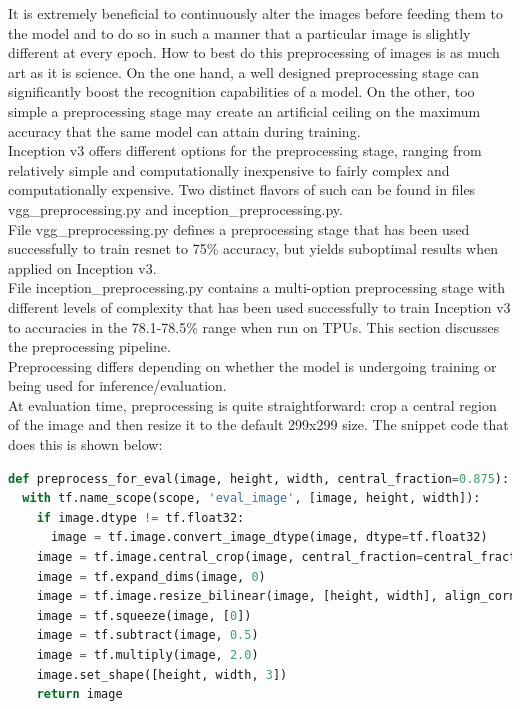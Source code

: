 \documentclass[14pt]{report}
\begin{document}
				It is extremely beneficial to continuously alter the images before feeding them to the model and to do so in such a manner that a particular image is slightly different at every epoch. How to best do this preprocessing of images is as much art as it is science. On the one hand, a well designed preprocessing stage can significantly boost the recognition capabilities of a model. On the other, too simple a preprocessing stage may create an artificial ceiling on the maximum accuracy that the same model can attain during training.\\

				Inception v3 offers different options for the preprocessing stage, ranging from relatively simple and computationally inexpensive to fairly complex and computationally expensive. Two distinct flavors of such can be found in files vgg\_preprocessing.py and inception\_preprocessing.py.\\

				File vgg\_preprocessing.py defines a preprocessing stage that has been used successfully to train resnet to 75\% accuracy, but yields suboptimal results when applied on Inception v3.\\

				File inception\_preprocessing.py contains a multi-option preprocessing stage with different levels of complexity that has been used successfully to train Inception v3 to accuracies in the 78.1-78.5\% range when run on TPUs. This section discusses the preprocessing pipeline.\\

				Preprocessing differs depending on whether the model is undergoing training or being used for inference/evaluation.\\

				At evaluation time, preprocessing is quite straightforward: crop a central region of the image and then resize it to the default 299x299 size. The snippet code that does this is shown below:\\
				\begin{lstlisting}[language=Python]
def preprocess_for_eval(image, height, width, central_fraction=0.875):
  with tf.name_scope(scope, 'eval_image', [image, height, width]):
    if image.dtype != tf.float32:
      image = tf.image.convert_image_dtype(image, dtype=tf.float32)
    image = tf.image.central_crop(image, central_fraction=central_fraction)
    image = tf.expand_dims(image, 0)
    image = tf.image.resize_bilinear(image, [height, width], align_corners=False)
    image = tf.squeeze(image, [0])
    image = tf.subtract(image, 0.5)
    image = tf.multiply(image, 2.0)
    image.set_shape([height, width, 3])
    return image
				\end{lstlisting}				
\end{document}

